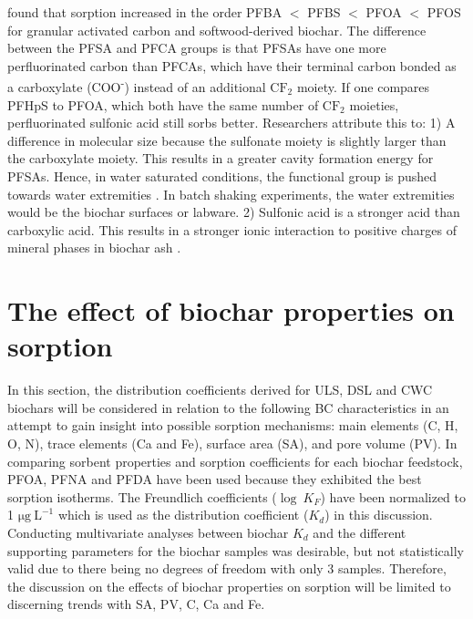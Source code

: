 \cite{zhang2021sorption} found that sorption increased in the order PFBA $<$ PFBS $<$ PFOA $<$ PFOS for granular activated carbon and softwood-derived biochar. The difference between the PFSA and PFCA groups is that PFSAs have one more perfluorinated carbon than PFCAs, which have their terminal carbon bonded as a carboxylate (COO\textsuperscript{-}) instead of an additional $\mathrm{CF_2}$ moiety. If one compares PFHpS to PFOA, which both have the same number of $\mathrm{CF_2}$ moieties, perfluorinated sulfonic acid still sorbs better. Researchers attribute this to: 1) A difference in molecular size because the sulfonate moiety is slightly larger than the carboxylate moiety. This results in a greater cavity formation energy for PFSAs. Hence, in water saturated conditions, the functional group is pushed towards water extremities \citep{yin2022insights,sigmund2022sorption}. In batch shaking experiments, the water extremities would be the biochar surfaces or labware. 2) Sulfonic acid is a stronger acid than carboxylic acid. This results in a stronger ionic interaction to positive charges of mineral phases in biochar ash \citep{arvaniti2015review}. 


\section{The effect of biochar properties on sorption}
In this section, the distribution coefficients derived for ULS, DSL and CWC biochars will be considered in relation to the following BC characteristics in an attempt to gain insight into possible sorption mechanisms: main elements (C, H, O, N), trace elements (Ca and Fe), surface area (\acrshort{SA}), and pore volume (\acrshort{PV}). In comparing sorbent properties and sorption coefficients for each biochar feedstock, PFOA, PFNA and PFDA have been used because they exhibited the best sorption isotherms. The Freundlich coefficients ($\log~K_F$) have been normalized to 1 $\mathrm{\mu g~L^{-1}}$ which is used as the distribution coefficient ($K_d$) in this discussion. Conducting multivariate analyses between biochar $K_d$ and the different supporting parameters for the biochar samples was desirable, but not statistically valid due to there being no degrees of freedom with only 3 samples. Therefore, the discussion on the effects of biochar properties on sorption will be limited to discerning trends with SA, PV, C, Ca and Fe. 

